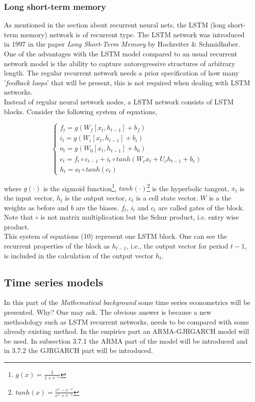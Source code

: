 \documentclass[12pt, letterpaper]{amsart}%
\begin{document}
\subsubsection{Long short-term memory}
As mentioned in the section about recurrent neural nets, the LSTM (long short-term memory) network is of recurrent type. The LSTM network was introduced in 1997 in the paper \textit{Long Short-Term Memory} by Hochreiter \& Schmidhuber. One of the advantages with the LSTM model compared to an usual recurrent network model is the ability to capture autoregressive structures of arbitrary length. The regular recurrent network needs a prior specification of how many '\textit{feedback loops}' that will be present, this is not required when dealing with LSTM networks.
\\

Instead of regular neural network nodes, a LSTM network consists of LSTM blocks. Consider the following system of equations,

\begin{equation}
\begin{cases}
f_t = g \left( W_f [x_t, h_{t-1}] + b_f \right)\\
i_t = g \left( W_i [x_t, h_{t-1}] + b_i \right)\\
o_t = g \left( W_0 [x_t, h_{t-1}] + b_0 \right)\\
c_t = f_t \circ c_{t-1} + i_t \circ tanh \left( W_c x_t + U_c h_{t-1} + b_c \right)\\
h_t = o_t \circ tanh \left( c_t \right)
\end{cases}
\end{equation}

where $g(\cdot)$ is the sigmoid function\footnote{$g(x)=\frac{1}{1+e^{-x}}$}, $tanh(\cdot)$\footnote{$tanh(x)= \frac{e^x - e^{-x}}{e^x + e^{-x}}$} is the hyperbolic tangent, $x_t$ is the input vector, $h_t$ is the output vector, $c_t$ is a cell state vector. $W$ is a the weights as before and $b$ are the biases. $f_t$, $i_t$ and $c_t$ are called gates of the block. Note that $\circ$ is not matrix multiplication but the Schur product, i.e. entry wise product.
\\

This system of equations (10) represent one LSTM block. One can see the recurrent properties of the block as $h_{t-1}$, i.e., the output vector for period $t-1$, is included in the calculation of the output vector $h_t$.

\subsection{Time series models}
In this part of the \textit{Mathematical background} some time series econometrics will be presented. Why? One may ask. The obvious answer is because a new methodology such as LSTM recurrent networks, needs to be compared with some already existing method. In the empirics part an ARMA-GJRGARCH model will be used. In subsection 3.7.1 the ARMA part of the model will be introduced and in 3.7.2 the GJRGARCH part will be introduced.
\end{document}
